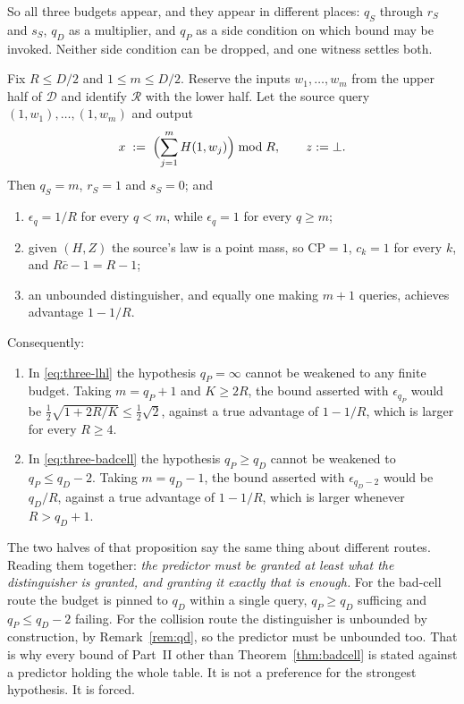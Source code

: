 \documentclass{aicr-solution}
\newcommand{\calD}{\mathcal{D}}
\newcommand{\calR}{\mathcal{R}}
\newcommand{\CP}{\mathrm{CP}}
\begin{document}
So all three budgets appear, and they appear in different places: $q_S$ through $r_S$ and $s_S$,
$q_D$ as a multiplier, and $q_P$ as a side condition on which bound may be invoked. Neither side
condition can be dropped, and one witness settles both.
\begin{proposition}\label{prop:qp}
Fix $R \le D/2$ and $1 \le m \le D/2$. Reserve the inputs $w_1,\dots,w_m$ from the upper half of
$\calD$ and identify $\calR$ with the lower half. Let the source query $(1,w_1),\dots,(1,w_m)$ and
output
\[
  x \;:=\; \Bigl(\sum_{j=1}^{m} H(1,w_j)\Bigr) \bmod R , \qquad z := \bot .
\]
Then $q_S = m$, $r_S = 1$ and $s_S = 0$; and
\begin{enumerate}
\item $\epsilon_q = 1/R$ for every $q < m$, while $\epsilon_q = 1$ for every $q \ge m$;
\item given $(H,Z)$ the source's law is a point mass, so $\CP = 1$, $c_k = 1$ for every $k$, and
      $R\bar c - 1 = R-1$;
\item an unbounded distinguisher, and equally one making $m+1$ queries, achieves advantage
      $1 - 1/R$.
\end{enumerate}
Consequently:
\begin{enumerate}
\item[(a)] In \eqref{eq:three-lhl} the hypothesis $q_P = \infty$ cannot be weakened to any finite
      budget. Taking $m = q_P + 1$ and $K \ge 2R$, the bound asserted with $\epsilon_{q_P}$ would be
      $\tfrac12\sqrt{1 + 2R/K} \le \tfrac12\sqrt2$, against a true advantage of $1 - 1/R$, which is
      larger for every $R \ge 4$.
\item[(b)] In \eqref{eq:three-badcell} the hypothesis $q_P \ge q_D$ cannot be weakened to
      $q_P \le q_D - 2$. Taking $m = q_D - 1$, the bound asserted with $\epsilon_{q_D-2}$ would be
      $q_D/R$, against a true advantage of $1 - 1/R$, which is larger whenever $R > q_D + 1$.
\end{enumerate}
\end{proposition}

The two halves of that proposition say the same thing about different routes. Reading them together:
\emph{the predictor must be granted at least what the distinguisher is granted, and granting it
exactly that is enough.} For the bad-cell route the budget is pinned to $q_D$ within a single query,
$q_P \ge q_D$ sufficing and $q_P \le q_D - 2$ failing. For the collision route the distinguisher is
unbounded by construction, by Remark~\ref{rem:qd}, so the predictor must be unbounded too. That is
why every bound of Part~II other than Theorem~\ref{thm:badcell} is stated against a predictor
holding the whole table. It is not a preference for the strongest hypothesis. It is forced.
\end{document}

